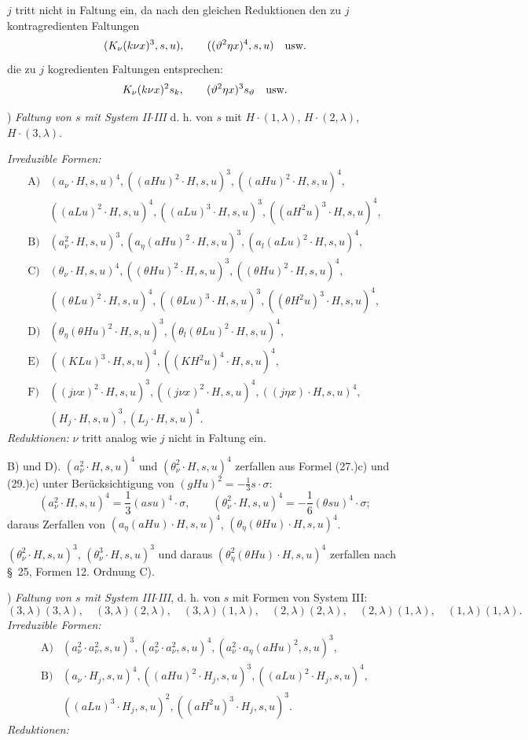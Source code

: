 $j$ tritt nicht in Faltung ein, da nach den gleichen Reduktionen den zu $j$ kontragredienten Faltungen
\[
(K_\nu(k\nu x)^3,s,u),\qquad ((\vartheta^2\eta x)^4,s,u)\quad\hbox{usw.}
\]
die zu $j$ kogredienten Faltungen entsprechen:
\[
K_\nu(k\nu x)^2s_k,
\qquad (\vartheta^2\eta x)^3s_\vartheta\quad\hbox{usw.}
\]

) \emph{Faltung von $s$ mit System II$\cdot$III}
d. h. von $s$ mit $H\cdot(1,\lambda)$, $H\cdot(2,\lambda)$, $H\cdot(3,\lambda)$.

\noindent\emph{Irreduzible Formen:}
\[
\begin{array}{rl}
\text{A)}&(a_\nu\cdot H,s,u)^4,
((aHu)^2\cdot H,s,u)^3,
((aHu)^2\cdot H,s,u)^4,\\[0.25em]
&((aLu)^2\cdot H,s,u)^4,
((aLu)^3\cdot H,s,u)^3,
((aH^2u)^3\cdot H,s,u)^4,\\[0.45em]
\text{B)}&(a_\nu^2\cdot H,s,u)^3,
(a_\eta(aHu)^2\cdot H,s,u)^3,
(a_l(aLu)^2\cdot H,s,u)^4,\\[0.45em]
\text{C)}&(\theta_\nu\cdot H,s,u)^4,
((\theta Hu)^2\cdot H,s,u)^3,
((\theta Hu)^2\cdot H,s,u)^4,\\[0.25em]
&((\theta Lu)^2\cdot H,s,u)^4,
((\theta Lu)^3\cdot H,s,u)^3,
((\theta H^2u)^3\cdot H,s,u)^4,\\[0.45em]
\text{D)}&(\theta_\eta(\theta Hu)^2\cdot H,s,u)^3,
(\theta_l(\theta Lu)^2\cdot H,s,u)^4,\\[0.45em]
\text{E)}&((KLu)^3\cdot H,s,u)^4,
((KH^2u)^4\cdot H,s,u)^4,\\[0.45em]
\text{F)}&((j\nu x)^2\cdot H,s,u)^3,
((j\nu x)^2\cdot H,s,u)^4,
((j\eta x)\cdot H,s,u)^4,\\[0.25em]
&(H_j\cdot H,s,u)^3,
(L_j\cdot H,s,u)^4.
\end{array}
\]
\noindent\emph{Reduktionen:} $\nu$ tritt analog wie $j$ nicht in Faltung ein.

B) und D). $(a_\nu^2\cdot H,s,u)^4$ und $(\theta_\nu^2\cdot H,s,u)^4$ zerfallen aus Formel (27.)c) und (29.)c) unter Berücksichtigung von $(gHu)^2=-\frac13s\cdot\sigma$:
\[
(a_\nu^2\cdot H,s,u)^4=\frac13(asu)^4\cdot\sigma,
\qquad
(\theta_\nu^2\cdot H,s,u)^4=-\frac16(\theta su)^4\cdot\sigma;
\]
daraus Zerfallen von $(a_\eta(aHu)\cdot H,s,u)^4$, $(\theta_\eta(\theta Hu)\cdot H,s,u)^4$.

$(\theta_\nu^2\cdot H,s,u)^3$, $(\theta_\nu^3\cdot H,s,u)^3$ und daraus $(\theta_\eta^2(\theta Hu)\cdot H,s,u)^4$ zerfallen nach \S\ 25, Formen 12. Ordnung C).

) \emph{Faltung von $s$ mit System III$\cdot$III}, d. h. von $s$ mit Formen von System III:
\[
(3,\lambda)(3,\lambda),\quad (3,\lambda)(2,\lambda),\quad (3,\lambda)(1,\lambda),\quad
(2,\lambda)(2,\lambda),\quad (2,\lambda)(1,\lambda),\quad
(1,\lambda)(1,\lambda).
\]
\noindent\emph{Irreduzible Formen:}
\[
\begin{array}{rl}
\text{A)}&(a_\nu^2\cdot a_\nu^2,s,u)^3,
(a_\nu^2\cdot a_\nu^2,s,u)^4,
(a_\nu^2\cdot a_\eta(aHu)^2,s,u)^3,\\[0.45em]
\text{B)}&(a_\nu\cdot H_j,s,u)^4,
((aHu)^2\cdot H_j,s,u)^3,
((aLu)^2\cdot H_j,s,u)^4,\\[0.25em]
&((aLu)^3\cdot H_j,s,u)^2,
((aH^2u)^3\cdot H_j,s,u)^3.
\end{array}
\]
\noindent\emph{Reduktionen:}

